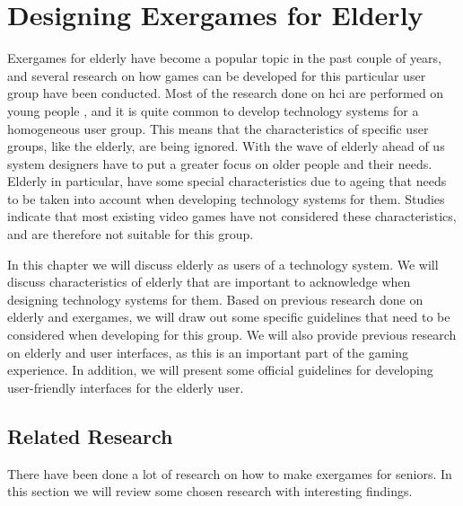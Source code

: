 \chapter{Designing Exergames for Elderly}
\label{chap:exforseniors}

Exergames for elderly have become a popular topic in the past couple of years, and several research on how games can be developed for this particular user group have been conducted. Most of the research done on \ac{hci} are performed on young people \cite{dickinson2007methods}, and it is quite common to develop technology systems for a homogeneous user group. This means that the characteristics of specific user groups, like the elderly, are being ignored. With the wave of elderly ahead of us system designers have to put a greater focus on older people and their needs. Elderly in particular, have some special characteristics due to ageing that needs to be taken into account when developing technology systems for them. Studies indicate that most existing video games have not considered these characteristics, and are therefore not suitable for this group. 

In this chapter we will discuss elderly as users of a technology system. We will discuss characteristics of elderly that are important to acknowledge when designing technology systems for them. Based on previous research done on elderly and exergames, we will draw out some specific guidelines that need to be considered when developing for this group. We will also provide previous research on elderly and user interfaces, as this is an important part of the gaming experience.  In addition, we will present some official guidelines for developing user-friendly interfaces for the elderly user. 

\section{Related Research}
\label{sec:relatedresearch}
There have been done a lot of research on how to make exergames for seniors. In this section we will review some chosen research with interesting findings.

